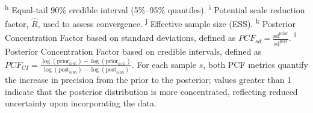 \documentclass[12pt]{article}
\begin{document}
\begin{table}[h!]
{	\textsuperscript{h} Equal-tail 90\% credible interval (5\%–95\% quantiles). 
	\textsuperscript{i} Potential scale reduction factor, \(\ensuremath{\hat{R}}\), used to assess convergence. 
	\textsuperscript{j} Effective sample size (ESS). 
	\textsuperscript{k} Posterior Concentration Factor based on standard deviations, defined as 
	\(\ensuremath{PCF_{sd} = \frac{\text{sd}^{\text{prior}}}{\text{sd}^{\text{post}}}}\).
	\textsuperscript{l} Posterior Concentration Factor based on credible intervals, defined as  
	\(\ensuremath{PCF_{CI} = \frac{\log(\text{prior}_{0.95})-\log(\text{prior}_{0.05})}{\log(\text{post}_{0.95})-\log(\text{post}_{0.05})}}\).
	For each sample \(s\), both PCF metrics quantify the increase in precision from the prior to the posterior; values greater than 1 indicate that the posterior distribution is more concentrated, reflecting reduced uncertainty upon incorporating the data.}
		\label{table2}
	\end{table}
	
\end{document}
